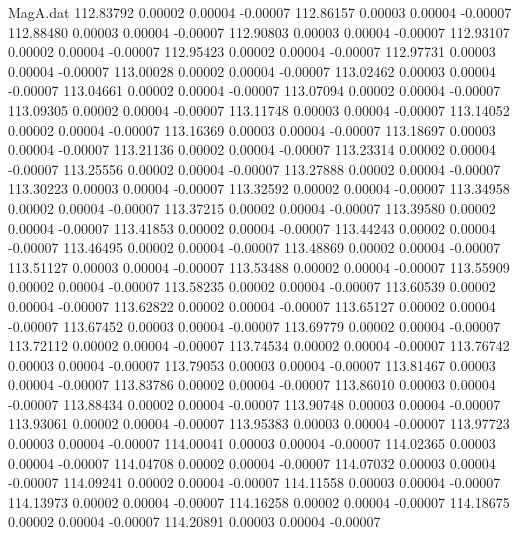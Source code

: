 \begin{filecontents}{MagA.dat}
 112.83792    0.00002    0.00004   -0.00007
 112.86157    0.00003    0.00004   -0.00007
 112.88480    0.00003    0.00004   -0.00007
 112.90803    0.00003    0.00004   -0.00007
 112.93107    0.00002    0.00004   -0.00007
 112.95423    0.00002    0.00004   -0.00007
 112.97731    0.00003    0.00004   -0.00007
 113.00028    0.00002    0.00004   -0.00007
 113.02462    0.00003    0.00004   -0.00007
 113.04661    0.00002    0.00004   -0.00007
 113.07094    0.00002    0.00004   -0.00007
 113.09305    0.00002    0.00004   -0.00007
 113.11748    0.00003    0.00004   -0.00007
 113.14052    0.00002    0.00004   -0.00007
 113.16369    0.00003    0.00004   -0.00007
 113.18697    0.00003    0.00004   -0.00007
 113.21136    0.00002    0.00004   -0.00007
 113.23314    0.00002    0.00004   -0.00007
 113.25556    0.00002    0.00004   -0.00007
 113.27888    0.00002    0.00004   -0.00007
 113.30223    0.00003    0.00004   -0.00007
 113.32592    0.00002    0.00004   -0.00007
 113.34958    0.00002    0.00004   -0.00007
 113.37215    0.00002    0.00004   -0.00007
 113.39580    0.00002    0.00004   -0.00007
 113.41853    0.00002    0.00004   -0.00007
 113.44243    0.00002    0.00004   -0.00007
 113.46495    0.00002    0.00004   -0.00007
 113.48869    0.00002    0.00004   -0.00007
 113.51127    0.00003    0.00004   -0.00007
 113.53488    0.00002    0.00004   -0.00007
 113.55909    0.00002    0.00004   -0.00007
 113.58235    0.00002    0.00004   -0.00007
 113.60539    0.00002    0.00004   -0.00007
 113.62822    0.00002    0.00004   -0.00007
 113.65127    0.00002    0.00004   -0.00007
 113.67452    0.00003    0.00004   -0.00007
 113.69779    0.00002    0.00004   -0.00007
 113.72112    0.00002    0.00004   -0.00007
 113.74534    0.00002    0.00004   -0.00007
 113.76742    0.00003    0.00004   -0.00007
 113.79053    0.00003    0.00004   -0.00007
 113.81467    0.00003    0.00004   -0.00007
 113.83786    0.00002    0.00004   -0.00007
 113.86010    0.00003    0.00004   -0.00007
 113.88434    0.00002    0.00004   -0.00007
 113.90748    0.00003    0.00004   -0.00007
 113.93061    0.00002    0.00004   -0.00007
 113.95383    0.00003    0.00004   -0.00007
 113.97723    0.00003    0.00004   -0.00007
 114.00041    0.00003    0.00004   -0.00007
 114.02365    0.00003    0.00004   -0.00007
 114.04708    0.00002    0.00004   -0.00007
 114.07032    0.00003    0.00004   -0.00007
 114.09241    0.00002    0.00004   -0.00007
 114.11558    0.00003    0.00004   -0.00007
 114.13973    0.00002    0.00004   -0.00007
 114.16258    0.00002    0.00004   -0.00007
 114.18675    0.00002    0.00004   -0.00007
 114.20891    0.00003    0.00004   -0.00007

\end{filecontents}
